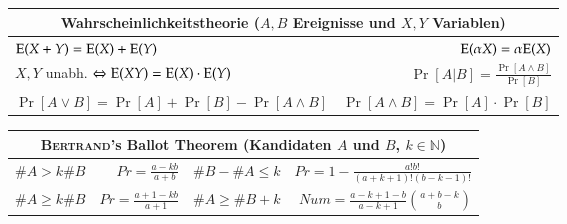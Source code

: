 \begin{tabular}{l|r}
	\toprule
	\multicolumn{2}{c}{
		Wahrscheinlichkeitstheorie ($A,B$ Ereignisse und $X,Y$ Variablen)
	} \\
	\midrule
	$\text{E}(X + Y) = \text{E}(X) + \text{E}(Y)$ &
	$\text{E}(\alpha X) = \alpha \text{E}(X)$ \\

	$X, Y$ unabh. $\Leftrightarrow \text{E}(XY) = \text{E}(X) \cdot \text{E}(Y)$ &
	$\Pr[A \vert B] = \frac{\Pr[A \land B]}{\Pr[B]}$ \\

	$\Pr[A \lor B] = \Pr[A] + \Pr[B] - \Pr[A \land B]$ &
	$\Pr[A \land B] = \Pr[A] \cdot \Pr[B]$ \\
	\bottomrule
\end{tabular}
\vspace{1mm}

\begin{tabular}{lr|lr}
	\toprule
	\multicolumn{4}{c}{\textsc{Bertrand}'s Ballot Theorem (Kandidaten $A$ und $B$, $k \in \mathbb{N}$)} \\
	\midrule
	$\#A > k\#B$ & $Pr = \frac{a - kb}{a + b}$ &
	$\#B - \#A \leq k$ & $Pr = 1 - \frac{a!b!}{(a + k + 1)!(b - k - 1)!}$ \\

	$\#A \geq k\#B$ & $Pr = \frac{a + 1 - kb}{a + 1}$ &
	$\#A \geq \#B + k$ & $Num = \frac{a - k + 1 - b}{a - k + 1} \binom{a + b - k}{b}$ \\
	\bottomrule
\end{tabular}
\vspace{5mm}

